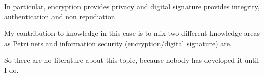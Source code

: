 In particular, encryption provides privacy and digital signature provides
integrity, authentication and non repudiation. 


My contribution to knowledge in this case is to mix two different
knowledge areas as Petri nets
and information security (encryption/digital signature) are.

So there are no literature about this topic, because nobody has developed it until I do.   


   

